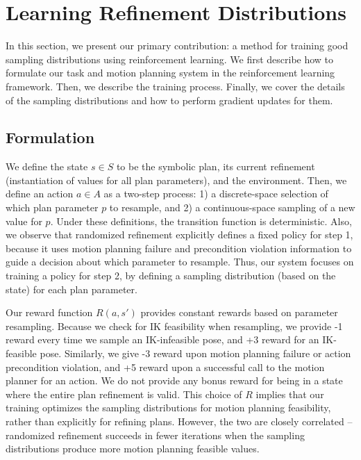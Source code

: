 \section{Learning Refinement Distributions}
In this section, we present our primary contribution: a method
for training good sampling distributions using reinforcement learning.
We first describe how to formulate our task and motion planning system
in the reinforcement learning framework. Then, we describe the training
process. Finally, we cover the details of the sampling distributions
and how to perform gradient updates for them.

\subsection{Formulation}
We define the state $s \in S$ to be the symbolic plan, its current refinement
(instantiation of values for all plan parameters), and the environment. Then, we define an action $a \in A$ as
a two-step process: 1) a discrete-space selection of which plan parameter $p$ to
resample, and 2) a continuous-space sampling of a new value for $p$. Under
these definitions, the transition function is deterministic. Also, we observe that
randomized refinement explicitly defines a fixed policy for
step 1, because it uses motion planning failure and precondition violation information
to guide a decision about which parameter to resample. Thus, our system focuses
on training a policy for step 2, by defining a sampling distribution (based on the
state) for each plan parameter.

Our reward function $R(a, s')$ provides constant rewards based on parameter resampling.
Because we check for IK feasibility when resampling, we provide -1 reward every
time we sample an IK-infeasible pose, and +3 reward for an IK-feasible pose.
Similarly, we give -3 reward upon motion planning failure or action precondition violation,
and +5 reward upon a successful call to the motion planner for an action. We do not
provide any bonus reward for being in a state where the entire plan refinement is valid.
This choice of $R$ implies that our training optimizes the sampling distributions for
motion planning feasibility, rather than explicitly for refining plans. However, the two are
closely correlated -- randomized refinement succeeds in fewer iterations when the sampling
distributions produce more motion planning feasible values.

